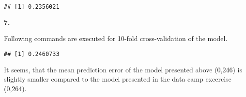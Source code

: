 \documentclass[]{article}
\newenvironment{Shaded}{\begin{snugshade}}{\end{snugshade}}
\newcommand{\DataTypeTok}[1]{\textcolor[rgb]{0.13,0.29,0.53}{#1}}
\newcommand{\DecValTok}[1]{\textcolor[rgb]{0.00,0.00,0.81}{#1}}
\newcommand{\KeywordTok}[1]{\textcolor[rgb]{0.13,0.29,0.53}{\textbf{#1}}}
\newcommand{\NormalTok}[1]{#1}
\newcommand{\OperatorTok}[1]{\textcolor[rgb]{0.81,0.36,0.00}{\textbf{#1}}}
\newcommand{\StringTok}[1]{\textcolor[rgb]{0.31,0.60,0.02}{#1}}
\begin{document}
\begin{verbatim}
## [1] 0.2356021
\end{verbatim}

\textbf{7.}

Following commands are executed for 10-fold cross-validation of the
model.

\begin{Shaded}
\end{Shaded}

\begin{verbatim}
## [1] 0.2460733
\end{verbatim}

It seems, that the mean prediction error of the model presented above
(0,246) is slightly smaller compared to the model presented in the data
camp excercise (0,264).
\end{document}
